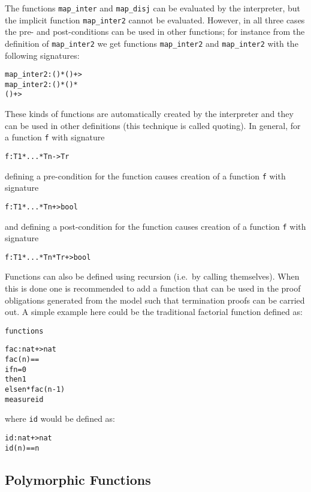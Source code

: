 \documentclass[\pformat,12pt]{article}
\begin{document}
The functions {\tt map\_inter} and {\tt map\_disj} can be evaluated by the
interpreter, but the implicit function {\tt map\_inter2} cannot be evaluated.
However, in all three cases the pre- and post-conditions can be used
in other functions; for instance from the definition of
\texttt{map\_inter2} we get functions \texttt{map\_inter2}
and \texttt{map\_inter2} with the following signatures:

\begin{alltt}
  map_inter2 : () * () +> 
  map_inter2 : () * () *
                   () +> 
\end{alltt}
These kinds of functions are automatically created by the
interpreter and they can be used in other definitions (this technique
is called quoting). In general, for a function \texttt{f} with
signature
\begin{alltt}
  f : T1 * ... * Tn -> Tr
\end{alltt}
defining a pre-condition for the function causes creation of a
function \texttt{f} with signature
\begin{alltt}
  f : T1 * ... * Tn +> bool
\end{alltt}
and defining a post-condition for the function causes creation of a
function \texttt{f} with signature
\begin{alltt}
  f : T1 * ... * Tn * Tr +> bool
\end{alltt}

Functions can also be defined using recursion (i.e.\ by calling
themselves). When this is done one is recommended to add
a  function that can be used in the proof obligations
generated from the model such that termination proofs can be carried
out. A simple example here could be the traditional factorial function
defined as:
\begin{alltt}
functions

fac: nat +> nat
fac(n) ==
  if n = 0
  then 1
  else n * fac(n - 1)
measure id
\end{alltt}
where \texttt{id} would be defined as:
\begin{alltt}
id: nat +> nat
id(n) == n
\end{alltt}

\subsection{Polymorphic Functions}
\end{document}
